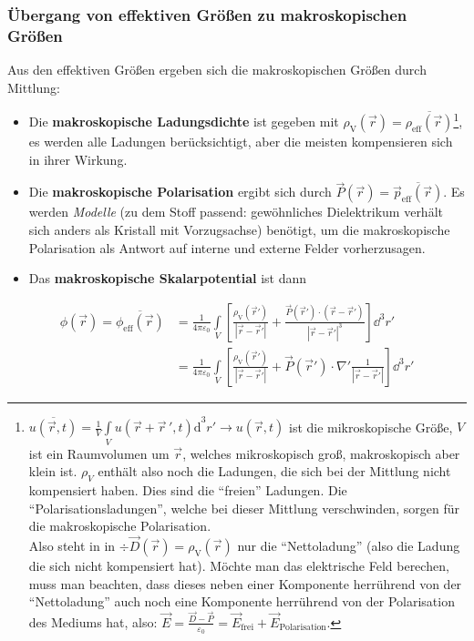 \subsubsection{Übergang von effektiven Größen zu makroskopischen Größen}
		   Aus den effektiven Größen ergeben sich die {makroskopischen} Größen durch Mittlung:
		   \begin{itemize}
		   	\item Die \textbf{makroskopische Ladungsdichte} ist gegeben mit $\rho_\text{V}(\vec{r} ) = \overline{\rho_{\text{eff}}(\vec{r} )} $\footnote{$\overline{u\left( \vec{r},t \right)}=\frac{1}{V}\int\limits_{V}{u\left( \vec{r}+\vec{r}\,',t \right)\mathrm{d}}^3r'\to u\left( \vec{r},t \right)$ ist die mikroskopische Größe, $V$ ist ein Raumvolumen um $\vec{r}$, welches mikroskopisch groß, makroskopisch aber klein ist. $\rho_{V}$ enthält also noch die Ladungen, die sich bei der Mittlung nicht kompensiert haben. Dies sind die \enquote{freien} Ladungen. Die \enquote{Polarisationsladungen}, welche bei dieser Mittlung verschwinden, sorgen für die makroskopische Polarisation.\\
		   	Also steht in in $\div \vec{D}(\vec{r} ) = \rho_\text{V}(\vec{r} )$ nur die \enquote{Nettoladung} (also die Ladung die sich nicht kompensiert hat). Möchte man das elektrische Feld berechen, muss man beachten, dass dieses neben einer Komponente herrührend von der \enquote{Nettoladung} auch noch eine Komponente herrührend von der Polarisation des Mediums hat, also: $\vec{E}=\frac{\vec{D}-\vec{P}}{\varepsilon_{0}}=\vec{E}_\text{frei}+\vec{E}_\text{Polarisation}$.}, es werden alle Ladungen berücksichtigt, aber die meisten kompensieren sich in ihrer Wirkung.
		   	\item Die \textbf{makroskopische Polarisation} ergibt sich durch $\vec{P}(\vec{r} ) = \overline{\vec{p}_{\text{eff}}(\vec{r} )} $. Es werden \textit{Modelle} (zu dem Stoff passend: gewöhnliches Dielektrikum verhält sich anders als Kristall mit Vorzugsachse) benötigt, um die makroskopische Polarisation als Antwort auf interne und externe Felder vorherzusagen.
		   	\item Das \textbf{makroskopische Skalarpotential} ist dann
		   \end{itemize}
		        \begin{equation}\begin{split}
				        \phi (\vec{r} ) = \overline{\phi _{\text{eff}}(\vec{r} )} &= \frac{1}{4\pi\varepsilon_0} \int\limits_V \left[ \frac{\rho_\text{V}(\vec{r}' )}{|\vec{r}  - \vec{r}'  |} + \frac{\vec{P}(\vec{r}' )  \cdot (\vec{r}  - \vec{r}'  )}{|\vec{r}  - \vec{r}'  |^3} \right] \dd^3 r' \\
				        &= \frac{1}{4\pi\varepsilon_0} \int\limits_V \left[ \frac{\rho_\text{V}(\vec{r}' )}{|\vec{r}  - \vec{r}'  |} + \vec{P}(\vec{r}' )  \cdot \nabla' \frac{1}{|\vec{r}  - \vec{r}'  |} \right] \dd^3 r'
			        \end{split}\end{equation}
